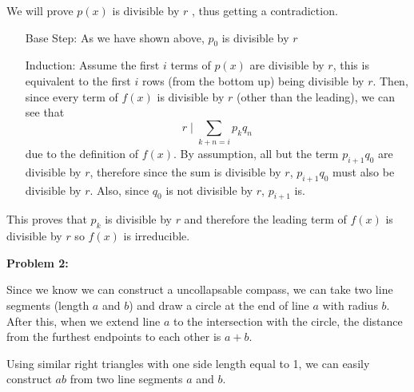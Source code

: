 \documentclass[letter paper, 12pt]{article}
\begin{document}
    We will prove $p(x)$ is divisible by $r$ , thus getting a contradiction.
    \begin{itemize}
        \item[Base Step:] As we have shown above, $p_0$ is divisible by $r$
        
        \item[Induction:] Assume the first $i$ terms of $p(x)$ are divisible by $r$, this is equivalent to the first $i$ rows (from the bottom up) being divisible by $r$. Then, since every term of $f(x)$ is divisible by $r$ (other than the leading), we can see that 
        $$r\mid\sum_{k+n=i}p_kq_n$$
        due to the definition of $f(x)$. By assumption, all but the term $p_{i+1}q_0$ are divisible by $r$, therefore since the sum is divisible by $r$, $p_{i+1}q_0$ must also be divisible by $r$. Also, since $q_0$ is not divisible by $r$, $p_{i+1}$ is. 
    \end{itemize}
    
    This proves that $p_k$ is divisible by $r$ and therefore the leading term of $f(x)$ is divisible by $r$ so $f(x)$ is irreducible.
    
\noindent\textbf{Problem 2:}
    
    Since we know we can construct a uncollapsable compass, we can take two line segments (length $a$ and $b$) and draw a circle at the end of line $a$ with radius $b$. After this, when we extend line $a$ to the intersection with the circle, the distance from the furthest endpoints to each other is $a+b$.
    
    Using similar right triangles with one side length equal to 1, we can easily construct $ab$ from two line segments $a$ and $b$.
    
\end{document}
